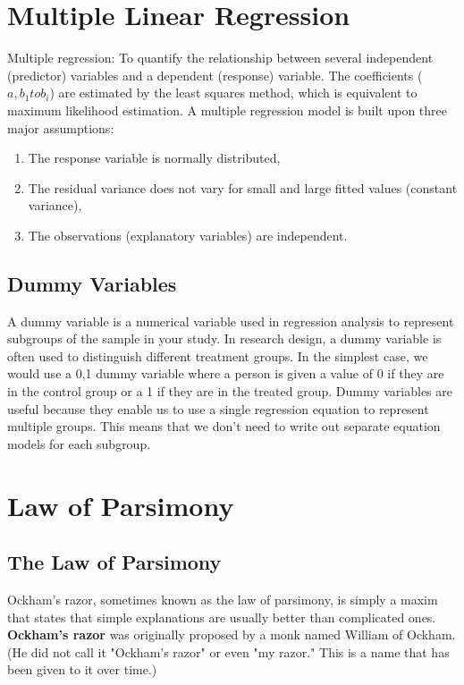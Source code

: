 \documentclass[a4paper,12pt]{article}
\begin{document}


\section{Multiple Linear Regression}
Multiple regression: To quantify the relationship between several independent (predictor) variables and a dependent (response) variable. The coefficients ($a, b_{1} to b_{i}$) are estimated by the least squares method, which is equivalent to maximum likelihood estimation. A multiple regression model is built upon three major assumptions:

\begin{enumerate}
\item The response variable is normally distributed,
\item The residual variance does not vary for small and large fitted values (constant variance),
\item The observations (explanatory variables) are independent.
\end{enumerate}


\subsection{Dummy Variables}
A dummy variable is a numerical variable used in regression analysis to represent subgroups of the sample in your study. In research design, a dummy variable is often used to distinguish different treatment groups. In the simplest case, we would use a 0,1 dummy variable where a person is given a value of 0 if they are in the control group or a 1 if they are in the treated group. Dummy variables are useful because they enable us to use a single regression equation to represent multiple groups. This means that we don't need to write out separate equation models for each subgroup.




\section{Law of Parsimony}
\subsection{The Law of Parsimony}
Ockham's razor, sometimes known as the law of parsimony, is simply a maxim that states that simple explanations are usually better than complicated ones. \textbf{Ockham's razor} was originally proposed by a monk named William of Ockham. (He did not call it "Ockham's razor" or even "my razor." This is a name that has been given to it over time.)
\end{document}
